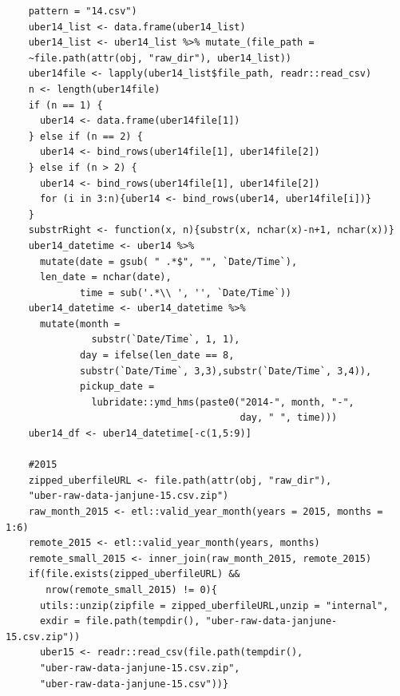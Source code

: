 \documentclass[12pt,twoside]{reedthesis}
\theoremstyle{definition}
\theoremstyle{definition}
\theoremstyle{definition}
\theoremstyle{remark}
\begin{document}
\begin{verbatim}
    pattern = "14.csv")
    uber14_list <- data.frame(uber14_list)
    uber14_list <- uber14_list %>% mutate_(file_path = 
    ~file.path(attr(obj, "raw_dir"), uber14_list))
    uber14file <- lapply(uber14_list$file_path, readr::read_csv)
    n <- length(uber14file)
    if (n == 1) {
      uber14 <- data.frame(uber14file[1])
    } else if (n == 2) {
      uber14 <- bind_rows(uber14file[1], uber14file[2])
    } else if (n > 2) {
      uber14 <- bind_rows(uber14file[1], uber14file[2])
      for (i in 3:n){uber14 <- bind_rows(uber14, uber14file[i])}
    }
    substrRight <- function(x, n){substr(x, nchar(x)-n+1, nchar(x))}
    uber14_datetime <- uber14 %>%
      mutate(date = gsub( " .*$", "", `Date/Time`), 
      len_date = nchar(date), 
             time = sub('.*\\ ', '', `Date/Time`))
    uber14_datetime <- uber14_datetime %>%
      mutate(month = 
               substr(`Date/Time`, 1, 1),
             day = ifelse(len_date == 8, 
             substr(`Date/Time`, 3,3),substr(`Date/Time`, 3,4)),
             pickup_date = 
               lubridate::ymd_hms(paste0("2014-", month, "-", 
                                         day, " ", time)))
    uber14_df <- uber14_datetime[-c(1,5:9)]
    
    #2015
    zipped_uberfileURL <- file.path(attr(obj, "raw_dir"),
    "uber-raw-data-janjune-15.csv.zip")
    raw_month_2015 <- etl::valid_year_month(years = 2015, months = 1:6)
    remote_2015 <- etl::valid_year_month(years, months)
    remote_small_2015 <- inner_join(raw_month_2015, remote_2015)
    if(file.exists(zipped_uberfileURL) && 
       nrow(remote_small_2015) != 0){
      utils::unzip(zipfile = zipped_uberfileURL,unzip = "internal",
      exdir = file.path(tempdir(), "uber-raw-data-janjune-15.csv.zip"))
      uber15 <- readr::read_csv(file.path(tempdir(),
      "uber-raw-data-janjune-15.csv.zip",
      "uber-raw-data-janjune-15.csv"))}
    

\end{verbatim}
\end{document}
